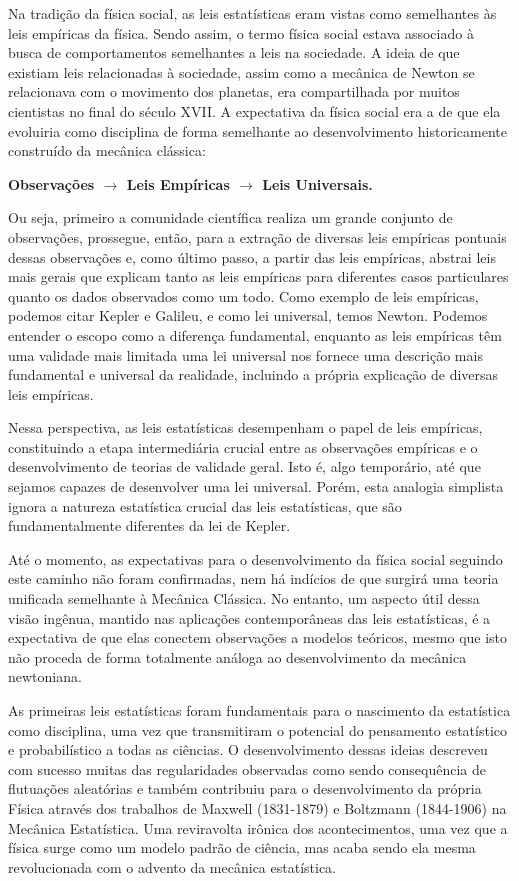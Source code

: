 Na tradição da física social, as leis estatísticas eram vistas como semelhantes às leis empíricas da física. Sendo assim, o termo física social estava associado à busca de comportamentos semelhantes a leis na sociedade. A ideia de que existiam leis relacionadas à sociedade, assim como a mecânica de Newton se relacionava com o movimento dos planetas, era compartilhada por muitos cientistas no final do século XVII. A expectativa da física social era a de que ela evoluiria como disciplina de forma semelhante ao desenvolvimento historicamente construído da mecânica clássica: 
\begin{center}
\textbf{Observações $\rightarrow$ Leis Empíricas $\rightarrow$  Leis Universais.}
\end{center}

Ou seja, primeiro a comunidade científica realiza um grande conjunto de observações, prossegue, então, para a extração de diversas leis empíricas pontuais dessas observações e, como último passo, a partir das leis empíricas, abstrai leis mais gerais que explicam tanto as leis empíricas para diferentes casos particulares quanto os dados observados como um todo. Como exemplo de leis empíricas, podemos citar Kepler e Galileu, e como lei universal, temos Newton. Podemos entender o escopo como a diferença fundamental, enquanto as leis empíricas têm uma validade mais limitada uma lei universal nos fornece uma descrição mais fundamental e universal da realidade, incluindo a própria explicação de diversas leis empíricas.

Nessa perspectiva, as leis estatísticas desempenham o papel de leis empíricas, constituindo a etapa intermediária crucial entre as observações empíricas e o desenvolvimento de teorias de validade geral. Isto é, algo temporário, até que sejamos capazes de desenvolver uma lei universal. Porém, esta analogia simplista ignora a natureza estatística crucial das leis estatísticas, que são fundamentalmente diferentes da lei de Kepler. 

Até o momento, as expectativas para o desenvolvimento da física social seguindo este caminho não foram confirmadas, nem há indícios de que surgirá uma teoria unificada semelhante à Mecânica Clássica. No entanto, um aspecto útil dessa visão ingênua, mantido nas aplicações contemporâneas das leis estatísticas, é a expectativa de que elas conectem observações a modelos teóricos, mesmo que isto não proceda de forma totalmente análoga ao desenvolvimento da mecânica newtoniana. 

As primeiras leis estatísticas foram fundamentais para o nascimento da estatística como disciplina, uma vez que transmitiram o potencial do pensamento estatístico e probabilístico a todas as ciências. O desenvolvimento dessas ideias descreveu com sucesso muitas das regularidades observadas como sendo consequência de flutuações aleatórias e também contribuiu para o desenvolvimento da própria Física através dos trabalhos de Maxwell (1831-1879) e Boltzmann (1844-1906) na Mecânica Estatística. Uma reviravolta irônica dos acontecimentos, uma vez que a física surge como um modelo padrão de ciência, mas acaba sendo ela mesma revolucionada com o advento da mecânica estatística. 


